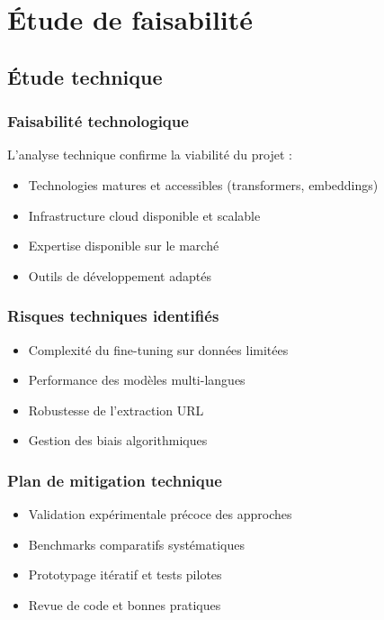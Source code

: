 \documentclass[12pt,a4paper]{report}
\begin{document}
\section{Étude de faisabilité}

\subsection{Étude technique}

\subsubsection{Faisabilité technologique}

L'analyse technique confirme la viabilité du projet :
\begin{itemize}
\item Technologies matures et accessibles (transformers, embeddings)
\item Infrastructure cloud disponible et scalable
\item Expertise disponible sur le marché
\item Outils de développement adaptés
\end{itemize}

\subsubsection{Risques techniques identifiés}

\begin{itemize}
\item Complexité du fine-tuning sur données limitées
\item Performance des modèles multi-langues
\item Robustesse de l'extraction URL
\item Gestion des biais algorithmiques
\end{itemize}

\subsubsection{Plan de mitigation technique}

\begin{itemize}
\item Validation expérimentale précoce des approches
\item Benchmarks comparatifs systématiques
\item Prototypage itératif et tests pilotes
\item Revue de code et bonnes pratiques
\end{itemize}
\end{document}
